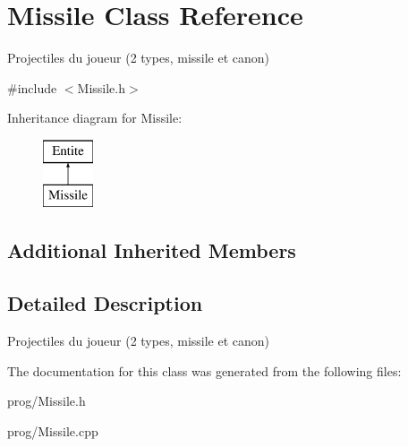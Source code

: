 \hypertarget{class_missile}{}\section{Missile Class Reference}
\label{class_missile}


Projectiles du joueur (2 types, missile et canon)  




{\ttfamily \#include $<$Missile.\+h$>$}

Inheritance diagram for Missile\+:\begin{figure}[H]
\begin{center}
\leavevmode
\includegraphics[height=2.000000cm]{class_missile}
\end{center}
\end{figure}
\subsection*{Additional Inherited Members}


\subsection{Detailed Description}
Projectiles du joueur (2 types, missile et canon) 

The documentation for this class was generated from the following files\+:\begin{DoxyCompactItemize}
\item 
prog/Missile.\+h\item 
prog/Missile.\+cpp\end{DoxyCompactItemize}
